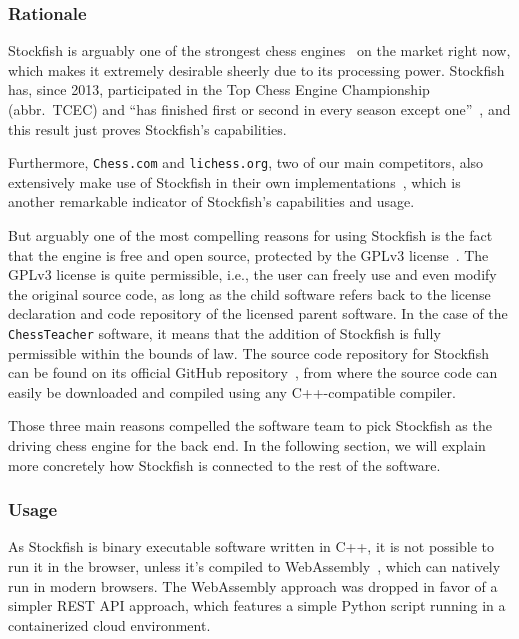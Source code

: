 \subsubsection{Rationale}

Stockfish is arguably one of the strongest chess engines~\cite{about-stockfish} on the market right now,
which makes it extremely desirable sheerly due to its processing power.
Stockfish has, since 2013, participated in the Top Chess Engine Championship (abbr.\ TCEC) and ``has finished first or
second in every season except one''~\cite{tcec-results,chess-com-stockfish},
and this result just proves Stockfish's capabilities.

Furthermore, \texttt{Chess.com} and \texttt{lichess.org}, two of our main competitors, also extensively make use of
Stockfish in their own implementations~\cite{chess-com-stockfish,about-lichess}, which is another remarkable indicator
of Stockfish's capabilities and usage.

But arguably one of the most compelling reasons for using Stockfish is the fact that the engine is free and open source,
protected by the GPLv3 license~\cite{gplv3}.
The GPLv3 license is quite permissible, i.e., the user can freely use and even modify the original source code, as long
as the child software refers back to the license declaration and code repository of the licensed parent software.
In the case of the \texttt{ChessTeacher} software, it means that the addition of Stockfish is fully permissible within
the bounds of law.
The source code repository for Stockfish can be found on its official GitHub repository~\cite{github-stockfish}, from
where the source code can easily be downloaded and compiled using any C++-compatible compiler.

Those three main reasons compelled the software team to pick Stockfish as the driving chess engine for the back end.
In the following section, we will explain more concretely how Stockfish is connected to the rest of the software.

\subsubsection{Usage}

As Stockfish is binary executable software written in C++, it is not possible to run it in the browser,
unless it's compiled to WebAssembly~\cite{web-assembly}, which can natively run in modern browsers.
The WebAssembly approach was dropped in favor of a simpler REST API approach,
which features a simple Python script running in a containerized cloud environment.

